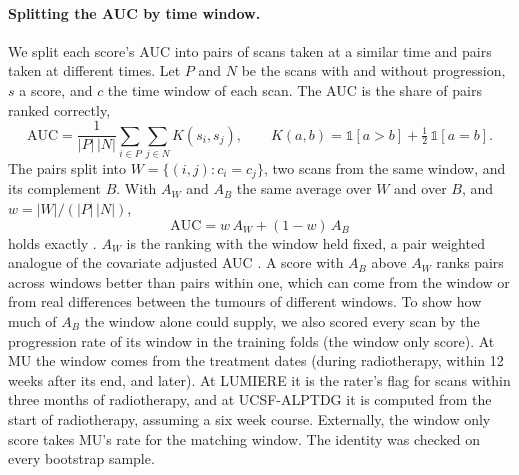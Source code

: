 \paragraph*{Splitting the AUC by time window.} We split each score's AUC into pairs of scans taken at a similar time
and pairs taken at different times. Let $P$ and $N$ be the scans with and without progression, $s$ a score, and $c$
the time window of each scan. The AUC is the share of pairs ranked correctly,
\begin{equation}
\mathrm{AUC} = \frac{1}{|P|\,|N|} \sum_{i \in P} \sum_{j \in N} K(s_i, s_j), \qquad
K(a, b) = \mathbb{1}[a > b] + \tfrac12\, \mathbb{1}[a = b].
\end{equation}
The pairs split into $W = \{(i, j) : c_i = c_j\}$, two scans from the same window, and its complement $B$. With
$A_W$ and $A_B$ the same average over $W$ and over $B$, and $w = |W| / (|P|\,|N|)$,
\begin{equation}
\mathrm{AUC} = w\, A_W + (1 - w)\, A_B
\end{equation}
holds exactly \citep{kallus2019}. $A_W$ is the ranking with the window held fixed, a pair weighted analogue of the
covariate adjusted AUC \citep{janes2008,janes2009}. A score with $A_B$ above $A_W$ ranks pairs across windows better
than pairs within one, which can come from the window or from real differences between the tumours of different
windows. To show how much of $A_B$ the window alone could supply, we also scored every scan by the progression rate of
its window in the training folds (the window only score). At MU the window comes from the treatment dates (during
radiotherapy, within 12 weeks after its end, and later). At LUMIERE it is the rater's flag for scans within three
months of radiotherapy, and at UCSF-ALPTDG it is computed from the start of radiotherapy, assuming a six week course.
Externally, the window only score takes MU's rate for the matching window. The identity was checked on every
bootstrap sample.

